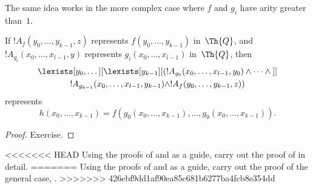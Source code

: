 \documentclass[../../../include/open-logic-section]{subfiles}
\begin{document}
The same idea works in the more complex case where $f$ and $g_i$ have
arity greater than~$1$.

\begin{prop}
If $!A_f(y_0, \dots, y_{k-1}, z)$ represents $f(y_0, \dots, y_{k-1})$
in~$\Th{Q}$, and $!A_{g_i}(x_0, \dots, x_{l-1}, y)$ represents
$g_i(x_0, \dots, x_{l-1})$ in~$\Th{Q}$, then
\begin{multline*}
  \lexists[y_0,\dots][\lexists[y_{k-1}][(!A_{g_0}(x_0,\dots,x_{l-1},y_0) \land
      \dots \land {}]]\\
  !A_{g_{k-1}}(x_0,\dots,x_{l-1},y_{k-1}) \land !A_f(y_0,\dots,y_{k-1},z))
\end{multline*}
represents
\[
h(x_0, \dots, x_{k-1}) = f(g_0(x_0, \dots, x_{k-1}), \dots, g_0(x_0,
\dots, x_{k-1})).
\]
\end{prop}

\begin{proof}
Exercise.
\end{proof}

\begin{prob}
<<<<<<< HEAD
Using the proofs of  and
 as a guide, carry out the proof of
 in detail.
=======
Using the proofs of  and  as a
guide, carry out the proof of the general case,
.
>>>>>>> 426ebf9dd1af90ea85c681b6277ba4fcb8e354dd
\end{prob}
\end{document}

